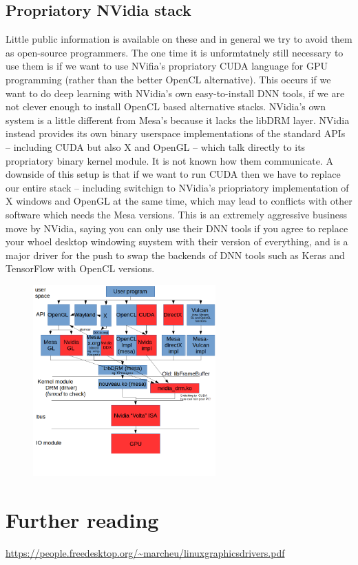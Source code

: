 \documentclass[oneside,english]{scrbook}
\begin{document}
\subsection{Propriatory NVidia stack}
Little public information is available on these and in general we try to avoid them as open-source programmers.   The one time it is unformtatnely still necessary to use them is if we want to use NVifia's propriatory CUDA language for GPU programming (rather than the better OpenCL alternative).  This occurs if we want to do deep learning with NVidia's own easy-to-install DNN tools, if we are not clever enough to install OpenCL based alternative stacks.   NVidia's own system is a little different from Mesa's because it lacks the libDRM layer.  NVidia instead provides its own binary userspace implementations of the standard APIs -- including CUDA but also X and OpenGL -- which talk directly to its propriatory binary kernel module.  It is not known how them communicate.   A downside of this setup is that if we want to run CUDA then we have to replace our entire stack -- including switchign to NVidia's priopriatory implementation of X windows and OpenGL at the same time, which may lead to conflicts with other software which needs the Mesa versions.  This is an extremely aggressive business move by NVidia, saying you can only use their DNN tools if you agree to replace your whoel desktop windowing suystem with their version of everything, and is a major driver for the push to swap the backends of DNN tools such as Keras and TensorFlow with OpenCL versions.  




\begin{figure}
	\caption{}
	\includegraphics[width=7cm]{figs/graphicsStack.png}
\end{figure}

\section{Further reading}
\url{https://people.freedesktop.org/~marcheu/linuxgraphicsdrivers.pdf}
\end{document}
